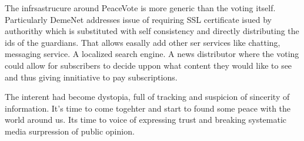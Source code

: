 \documentclass{article}
\begin{document}
The infrsastrucure around PeaceVote is more generic than the voting itself. Particularly DemeNet addresses issue of requiring SSL certificate isued by authorithy which is substituted with self consistency and directly distributing the ids of the guardians. That allows easally add other ser services like chatting, messaging service. A localized search engine. A news distributor where the voting could allow for subscribers to decide uppon what content they would like to see and thus giving innitiative to pay subscriptions.

The interent had become dystopia, full of tracking and suspicion of sincerity of information. It's time to come togehter and start to found some peace with the world around us. Its time to voice of expressing trust and breaking systematic media surpression of public opinion.
\end{document}
